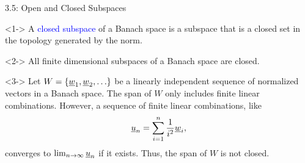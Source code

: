 \documentclass[10pt,english,aspectratio=169]{beamer}
\begin{document}
\begin{frame}{3.5: Open and Closed Subspaces}

\begin{definition}<1->
A \textcolor{blue}{closed subspace} of a Banach space is a subspace that is a closed set in the topology generated by the norm.
\end{definition}
\vspace{-0.5mm}

\begin{theorem}<2->
All finite dimensional subspaces of a Banach space are closed.
\end{theorem}
\vspace{-0.5mm}

\begin{example}<3->
Let $W = \{\underline{w}_1 ,\underline{w}_2 , \ldots \}$ be a linearly independent sequence of normalized vectors in a Banach space.
The span of $W$ only includes finite linear combinations.
However, a sequence of finite linear combinations, like \vspace{-2mm}
\[ \vecnot{u}_n = \sum_{i=1}^n \frac{1}{i^2} \vecnot{w}_i , \vspace{-1.5mm} \]  converges to $\lim_{n\to \infty} \underline{u}_n$ if it exists.
Thus, the span of $W$ is not closed.
\end{example}
\vspace{-0.5mm}


\end{frame}
\end{document}
